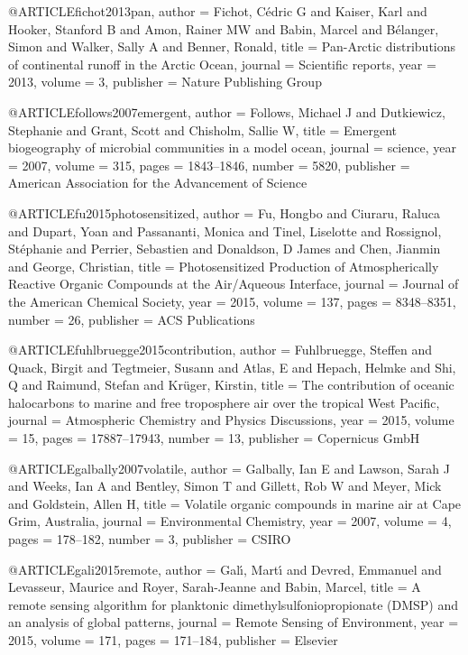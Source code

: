 @ARTICLE{fichot2013pan,
  author = {Fichot, C{\'e}dric G and Kaiser, Karl and Hooker, Stanford B and
	Amon, Rainer MW and Babin, Marcel and B{\'e}langer, Simon and Walker,
	Sally A and Benner, Ronald},
  title = {Pan-Arctic distributions of continental runoff in the Arctic Ocean},
  journal = {Scientific reports},
  year = {2013},
  volume = {3},
  publisher = {Nature Publishing Group}
}

@ARTICLE{follows2007emergent,
  author = {Follows, Michael J and Dutkiewicz, Stephanie and Grant, Scott and
	Chisholm, Sallie W},
  title = {Emergent biogeography of microbial communities in a model ocean},
  journal = {science},
  year = {2007},
  volume = {315},
  pages = {1843--1846},
  number = {5820},
  publisher = {American Association for the Advancement of Science}
}

@ARTICLE{fu2015photosensitized,
  author = {Fu, Hongbo and Ciuraru, Raluca and Dupart, Yoan and Passananti, Monica
	and Tinel, Liselotte and Rossignol, St{\'e}phanie and Perrier, Sebastien
	and Donaldson, D James and Chen, Jianmin and George, Christian},
  title = {Photosensitized Production of Atmospherically Reactive Organic Compounds
	at the Air/Aqueous Interface},
  journal = {Journal of the American Chemical Society},
  year = {2015},
  volume = {137},
  pages = {8348--8351},
  number = {26},
  publisher = {ACS Publications}
}

@ARTICLE{fuhlbruegge2015contribution,
  author = {Fuhlbruegge, Steffen and Quack, Birgit and Tegtmeier, Susann and
	Atlas, E and Hepach, Helmke and Shi, Q and Raimund, Stefan and Kr{\"u}ger,
	Kirstin},
  title = {The contribution of oceanic halocarbons to marine and free troposphere
	air over the tropical West Pacific},
  journal = {Atmospheric Chemistry and Physics Discussions},
  year = {2015},
  volume = {15},
  pages = {17887--17943},
  number = {13},
  publisher = {Copernicus GmbH}
}

@ARTICLE{galbally2007volatile,
  author = {Galbally, Ian E and Lawson, Sarah J and Weeks, Ian A and Bentley,
	Simon T and Gillett, Rob W and Meyer, Mick and Goldstein, Allen H},
  title = {Volatile organic compounds in marine air at Cape Grim, Australia},
  journal = {Environmental Chemistry},
  year = {2007},
  volume = {4},
  pages = {178--182},
  number = {3},
  publisher = {CSIRO}
}

@ARTICLE{gali2015remote,
  author = {Gal{\'\i}, Mart{\'\i} and Devred, Emmanuel and Levasseur, Maurice
	and Royer, Sarah-Jeanne and Babin, Marcel},
  title = {A remote sensing algorithm for planktonic dimethylsulfoniopropionate
	(DMSP) and an analysis of global patterns},
  journal = {Remote Sensing of Environment},
  year = {2015},
  volume = {171},
  pages = {171--184},
  publisher = {Elsevier}
}

